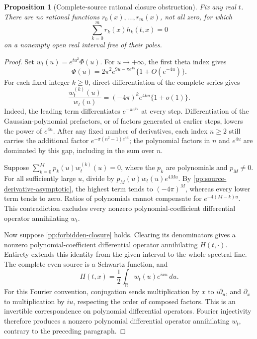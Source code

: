\documentclass[11pt]{article}
\numberwithin{equation}{section}
\newtheorem{proposition}[theorem]{Proposition}
\theoremstyle{definition}
\theoremstyle{remark}
\newcommand{\R}{\mathbb R}
\newcommand{\dd}{\,d}
\begin{document}
\begin{proposition}[Complete-source rational closure obstruction]
\label{pp:no-rational-closure}
Fix any real \(t\). There are no rational functions
\(r_0(x),\ldots,r_m(x)\), not all zero, for which
\begin{equation}
 \sum_{k=0}^m r_k(x)h_k(t,x)=0
 \label{pp:forbidden-closure}
\end{equation}
on a nonempty open real interval free of their poles.
\end{proposition}
\begin{proof}
Set \(w_t(u)=e^{tu^2}\Phi(u)\). For \(u\to+\infty\),
the first theta index gives
\[
 \Phi(u)=2\pi^2e^{9u-\pi e^{4u}}\{1+O(e^{-4u})\}.
\]
For each fixed integer \(k\ge0\), direct differentiation of the
complete series gives
\begin{equation}
 \frac{w_t^{(k)}(u)}{w_t(u)}
       =(-4\pi)^k e^{4ku}\{1+o(1)\}.
 \label{pp:source-derivative-asymptotic}
\end{equation}
Indeed, the leading term differentiates
\(e^{-\pi e^{4u}}\) at every step. Differentiation of the
Gaussian-polynomial prefactors, or of factors generated at earlier
steps, lowers the power of \(e^{4u}\). After any fixed number of
derivatives, each index \(n\ge2\) still carries the additional
factor \(e^{-\pi(n^2-1)e^{4u}}\); the polynomial factors in
\(n\) and \(e^{4u}\) are dominated by this gap, including in
the sum over \(n\).

Suppose \(\sum_{k=0}^M p_k(u)w_t^{(k)}(u)=0\), where the
\(p_k\) are polynomials and \(p_M\ne0\). For all sufficiently
large \(u\), divide by \(p_M(u)w_t(u)e^{4Mu}\).
By \eqref{pp:source-derivative-asymptotic}, the highest term tends
to \((-4\pi)^M\), whereas every lower term tends to zero.
Ratios of polynomials cannot compensate for
\(e^{-4(M-k)u}\). This contradiction excludes every nonzero
polynomial-coefficient differential operator annihilating \(w_t\).

Now suppose \eqref{pp:forbidden-closure} holds. Clearing its
denominators gives a nonzero polynomial-coefficient differential
operator annihilating \(H(t,\cdot)\). Entirety extends this
identity from the given interval to the whole spectral line.
The complete even source is a Schwartz function, and
\[
 H(t,x)=\frac12\int_{\R}w_t(u)e^{ixu}\dd u.
\]
For this Fourier convention, conjugation sends multiplication by
\(x\) to \(i\partial_u\), and \(\partial_x\) to
multiplication by \(iu\), respecting the order of composed factors.
This is an invertible correspondence on polynomial differential
operators. Fourier injectivity therefore produces a nonzero
polynomial differential operator annihilating \(w_t\), contrary
to the preceding paragraph.
\end{proof}
\end{document}
